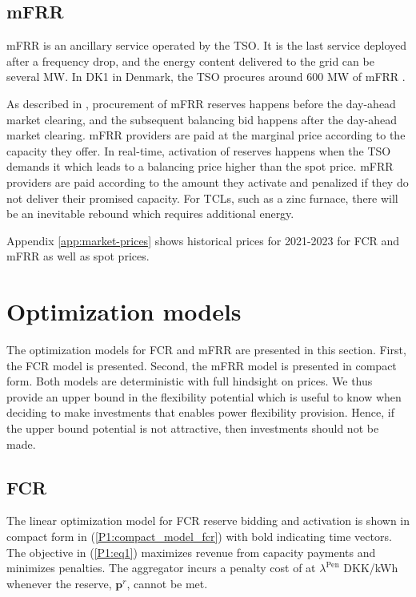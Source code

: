 \documentclass[sigconf]{acmart}
\begin{document}
\subsection{mFRR}

mFRR is an ancillary service operated by the TSO. It is the last service deployed after a frequency drop, and the energy content delivered to the grid can be several MW. In DK1 in Denmark, the TSO procures around 600 MW of mFRR \cite{energinet:scenario_report_2022}.

As described in \cite{gade2023load}, procurement of mFRR reserves happens before the day-ahead market clearing, and the subsequent balancing bid happens after the day-ahead market clearing. mFRR providers are paid at the marginal price according to the capacity they offer. In real-time, activation of reserves happens when the TSO demands it which leads to a balancing price higher than the spot price. mFRR providers are paid according to the amount they activate and penalized if they do not deliver their promised capacity. For TCLs, such as a zinc furnace, there will be an inevitable rebound which requires additional energy.

Appendix \ref{app:market-prices} shows historical prices for 2021-2023 for FCR and mFRR as well as spot prices.


\section{Optimization models}

The optimization models for FCR and mFRR are presented in this section. First, the FCR model is presented. Second, the mFRR model is presented in compact form. Both models are deterministic with full hindsight on prices. We thus provide an upper bound in the flexibility potential which is useful to know when deciding to make investments that enables power flexibility provision. Hence, if the upper bound potential is not attractive, then investments should not be made.

\subsection{FCR}

The linear optimization model for FCR reserve bidding and activation is shown in compact form in (\ref{P1:compact_model_fcr}) with bold indicating time vectors. The objective in (\ref{P1:eq1}) maximizes revenue from capacity payments and minimizes penalties. The aggregator incurs a penalty cost of at $\lambda^{\text{Pen}}$ DKK/kWh whenever the reserve, $\bm{p}^{r}$, cannot be met.
\end{document}
